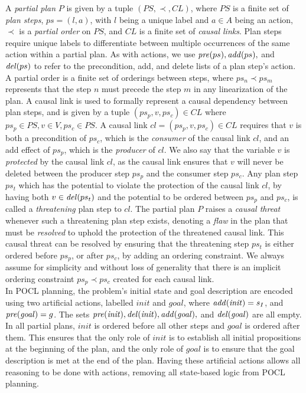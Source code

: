 A \textit{partial plan} $P$ is given by a tuple $(PS,\prec , CL)$, where $PS$ is a finite set of \textit{plan steps}, $ps=(l,a)$, with $l$ being a unique label and $a\in A$ being an action, $\prec$ is a \textit{partial order} on $PS$, and $CL$ is a finite set of \textit{causal links}. Plan steps require unique labels to differentiate between multiple occurrences of the same action within a partial plan. As with actions, we use $\mathit{pre}(ps),\mathit{add}(ps),$ and $\mathit{del}(ps)$ to refer to the precondition, add, and delete lists of a plan step's action. A partial order is a finite set of orderings between steps, where $ps_n \prec ps_m$ represents that the step $n$ must precede the step $m$ in any linearization of the plan. A causal link is used to formally represent a causal dependency between plan steps, and is given by a tuple $(ps_p, v, ps_c)\in CL$ where $ps_p \in PS, v\in V, ps_c \in PS$. A causal link $cl=(ps_p, v, ps_c)\in CL$ requires that $v$ is both a precondition of $ps_c$, which is the \textit{consumer} of the causal link $cl$, and an add effect of $ps_p$, which is the \textit{producer} of $cl$. We also say that the variable $v$ is \textit{protected} by the causal link $cl$, as the causal link ensures that $v$ will never be deleted between the producer step $ps_p$ and the consumer step $ps_c$. Any plan step $ps_t$ which has the potential to violate the protection of the causal link $cl$, by having both $v\in \mathit{del} (ps_t)$ and the potential to be ordered between $ps_p$ and $ps_c$, is called a \textit{threatening} plan step to $cl$. The partial plan $P$ raises a \textit{causal threat} whenever such a threatening plan step exists, denoting a \textit{flaw} in the plan that must be \textit{resolved} to uphold the protection of the threatened causal link. This causal threat can be resolved by ensuring that the threatening step $ps_t$ is either ordered before $ps_p$, or after $ps_c$, by adding an ordering constraint. We always assume for simplicity and without loss of generality that there is an implicit ordering constraint $ps_p\prec ps_c$ created for each causal link.\\


In POCL planning, the problem's initial state and goal description are encoded using two artificial actions, labelled $\mathit{init}$ and $\mathit{goal}$, where $\mathit{add}(\mathit{init})=s_I$, and $\mathit{pre}(\mathit{goal})=g$. The sets $\mathit{pre}(\mathit{init}),\mathit{del}(\mathit{init}),\mathit{add}(\mathit{goal}),$ and $\mathit{del}(\mathit{goal})$ are all empty. In all partial plans, $\mathit{init}$ is ordered before all other steps and $\mathit{goal}$ is ordered after them. This ensures that the only role of $\mathit{init}$ is to establish all initial propositions at the beginning of the plan, and the only role of $\mathit{goal}$ is to ensure that the goal description is met at the end of the plan. Having these artificial actions allows all reasoning to be done with actions, removing all state-based logic from POCL planning.\\


